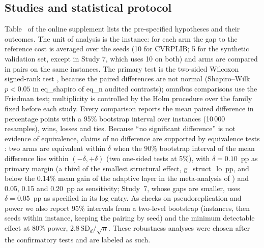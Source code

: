 \subsection{Studies and statistical protocol}
Table~ of the online supplement lists the pre-specified hypotheses and their outcomes.
The unit of analysis is the instance: for each arm the gap to the reference cost is averaged over the seeds (10 for CVRPLIB; 5 for the synthetic validation set, except in Study 7, which uses 10 on both) and arms are compared in pairs on the same instances. The primary test is the two-sided Wilcoxon signed-rank test \citep{wilcoxon1945}, because the paired differences are not normal (Shapiro--Wilk $p<0.05$ in \num{eq_shapiro} of \num{eq_n} audited contrasts); omnibus comparisons use the Friedman test; multiplicity is controlled by the Holm procedure \citep{holm1979} over the family fixed before each study. Every comparison reports the mean paired difference in percentage points with a 95\% bootstrap interval over instances (10\,000 resamples), wins, losses and ties. Because ``no significant difference'' is not evidence of equivalence, claims of no difference are supported by equivalence tests \citep{lakens2017}: two arms are equivalent within $\delta$ when the 90\% bootstrap interval of the mean difference lies within $(-\delta,+\delta)$ (two one-sided tests at 5\%), with $\delta=0.10$~pp as primary margin (a third of the smallest structural effect, \num{g_struct_lo}~pp, and below the 0.14\% mean gain of the adaptive layer in the meta-analysis of \citealp{turkes2021}) and 0.05, 0.15 and 0.20~pp as sensitivity; Study~7, whose gaps are smaller, uses $\delta=0.05$~pp as specified in its log entry. As checks on pseudoreplication and power we also report 95\% intervals from a two-level bootstrap (instances, then seeds within instance, keeping the pairing by seed) and the minimum detectable effect at 80\% power, $2.8\,\mathrm{SD}_d/\sqrt{n}$. These robustness analyses were chosen after the confirmatory tests and are labeled as such.

